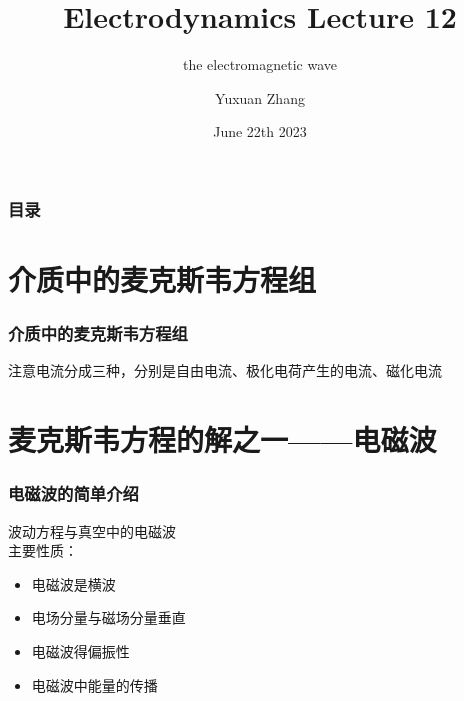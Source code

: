 \documentclass[10pt]{beamer}
\title[About Beamer] %
{Electrodynamics Lecture 12}
\subtitle{ the electromagnetic wave }
\author %
{Yuxuan Zhang }
\institute[VFU] %
{
  School of Physics \quad
  Zhejiang University
}
\date[VLC 2021] %
{June 22th 2023}
\begin{document}
\frame{\titlepage}

\begin{frame}
    \frametitle{目录}
    \tableofcontents
\end{frame}

\section{介质中的麦克斯韦方程组}
\begin{frame}
    \frametitle{介质中的麦克斯韦方程组}
    注意电流分成三种，分别是自由电流、极化电荷产生的电流、磁化电流
\end{frame}

\section{麦克斯韦方程的解之一——电磁波}
\begin{frame}
    \frametitle{电磁波的简单介绍}
    波动方程与真空中的电磁波\\
    主要性质：
    \begin{itemize}
      \item 电磁波是横波
      \item 电场分量与磁场分量垂直
      \item 电磁波得偏振性
      \item 电磁波中能量的传播
    \end{itemize}

\end{frame}
\end{document}
